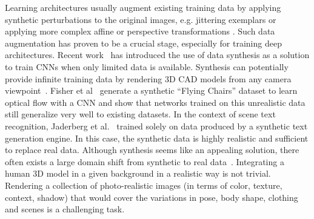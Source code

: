 \documentclass{article}
\begin{document}
Learning architectures usually augment existing training data by
applying synthetic perturbations to the original images,
e.g. jittering exemplars  or applying more complex affine or
perspective transformations \cite{JaderbergSZK15}. Such
data augmentation has proven to be a crucial stage, especially for
training deep architectures.
Recent
work~\cite{JaderbergSVZ16,PengSAS15,SuQLG15,WuSKYZTX15_ShapeNets} has
introduced the use of data synthesis as a solution to train CNNs when
only limited data is available. Synthesis can potentially provide
infinite training data by rendering 3D CAD models from any camera
viewpoint~\cite{PengSAS15,SuQLG15,WuSKYZTX15_ShapeNets}. Fisher et
al~\cite{DosovitskiyFIHH15_FlowNet} generate a synthetic ``Flying
Chairs'' dataset to learn optical flow with a CNN and show that networks
trained on this unrealistic data still generalize very well to
existing datasets. In the context of scene text recognition, Jaderberg
et al.~\cite{JaderbergSVZ16} trained solely on data produced by a
synthetic text generation engine. In this case, the synthetic data is
highly realistic and sufficient to replace real data. Although
synthesis seems like an appealing solution, there often exists a large
domain shift from synthetic to real data~\cite{PengSAS15}. Integrating
a human 3D model in a given background in a realistic way is not
trivial. Rendering a collection of photo-realistic images  (in terms
of color, texture, context, shadow) that would cover the variations in
pose, body shape, clothing and scenes is a challenging task.  
\end{document}
